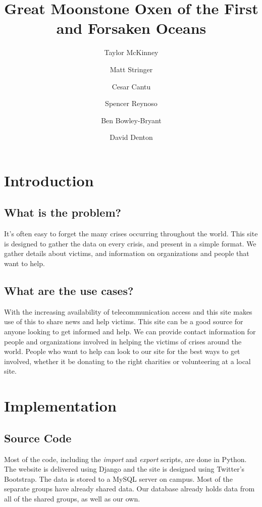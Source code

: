 \documentclass[12pt]{report}
\title{Great Moonstone Oxen of the First and Forsaken Oceans}
\author{
    Taylor McKinney
    \and Matt Stringer
    \and Cesar Cantu
    \and Spencer Reynoso
    \and Ben Bowley-Bryant
    \and David Denton}
\begin{document}
\maketitle

\section*{Introduction}
\subsection*{What is the problem?}
\hfill


It's often easy to forget the many crises occurring throughout the world.
This site is designed to gather the data on every crisis, and present in a simple format.
We gather details about victims, and information on organizations and people that want to help.

\subsection*{What are the use cases?}
\hfill


With the increasing availability of telecommunication access and this site makes use of this to share news and help victims.
This site can be a good source for anyone looking to get informed and help. 
We can provide contact information for people and organizations involved in helping the victims of crises around the world.
People who want to help can look to our site for the best ways to get involved, whether it be donating to the right charities or volunteering at a local site.


\newpage
\section*{Implementation}
\hfill


\subsection*{Source Code}
\hfill


Most of the code, including the \emph{import} and \emph{export} scripts, are done in Python.
The website is delivered using Django and the site is designed using Twitter's Bootstrap.
The data is stored to a MySQL server on campus.
Most of the separate groups have already shared data.
Our database already holds data from all of the shared groups, as well as our own.\\
\end{document}

